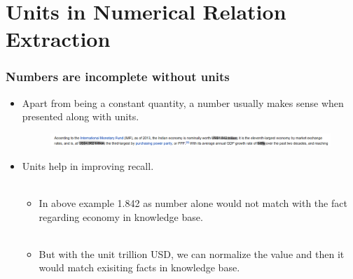 \documentclass{beamer}
\begin{document}
\section{Units in Numerical Relation Extraction}
\begin{frame}
 
 \frametitle{Numbers are incomplete without units} \pause
 
 \begin{itemize}
  
  \item  Apart from being a constant quantity, a number usually makes sense when presented along with units. \pause
  
    \begin{figure}
    \centering
    \includegraphics[width = 1.0\textwidth]{images/ex_6}
  \end{figure}
  \pause 
  \item Units help in improving recall.  \pause \\~\\ 
  
  \begin{itemize}
      \item In above example 1.842 as number alone would not match with the fact regarding economy in knowledge base. \pause \\~\\
      \item But with the unit trillion USD, we can normalize the value and then it would match exisiting facts in knowledge base. 
      
  \end{itemize}
  \end{itemize}
  \end{frame}
\end{document}
